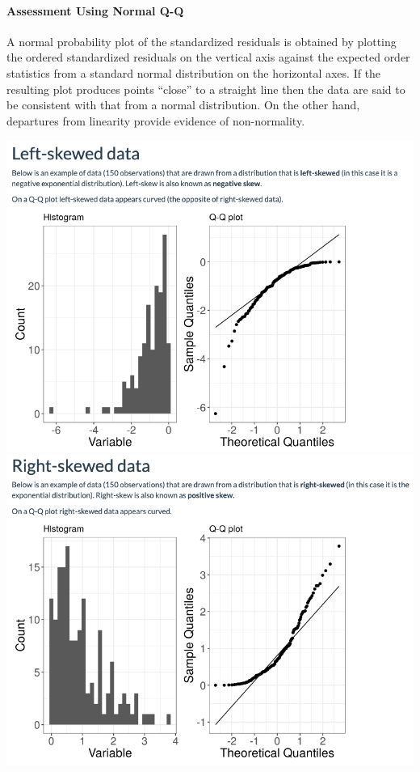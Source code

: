 \documentclass[10pt]{article}
\begin{document}
\paragraph{Assessment Using Normal Q-Q}
A normal probability plot of the standardized residuals is obtained by plotting the ordered standardized residuals on the vertical axis against the expected order statistics from a standard normal distribution on the horizontal axes. If the resulting plot produces points ``close'' to a straight line then the data are said to be consistent with that from a normal distribution. On the other hand, departures from linearity provide evidence of non-normality. 
\begin{center}
    \includegraphics[scale=0.25]{img/qq_left.png}
    \includegraphics[scale=0.25]{img/qq_right.png}

\end{center}
\end{document}
